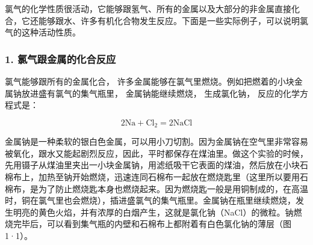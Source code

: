 氯气的化学性质很活动，它能够跟氢气、所有的金属以及大部分的非金属直接化合，它还能够跟水、许多有机化合物发生反应。下面是一些实际例子，可以说明氯气的这种活动性质。

\subsubsection{1. 氯气跟金属的化合反应}

氯气能够跟所有的金属化合，
许多金属能够在氯气里燃烧。例如把燃着的小块金属钠放进盛有氯气的集气瓶里，
金属钠能继续燃烧， 生成氯化钠， 反应的化学方程式是：

\[
2 \mathrm{Na} + \mathrm{Cl} _ {2} = 2 \mathrm{NaCl}
\]

金属钠是一种柔软的银白色金属，可以用小刀切割。因为金属钠在空气里非常容易被氧化，跟水又能起剧烈反应，因此，平时都保存在煤油里。做这个实验的时候，先用镊子从煤油里夹出一小块金属钠，用滤纸吸干它表面的煤油，然后放在小块石棉布上，加热至钠开始燃烧，迅速连同石棉布一起放在燃烧匙里（这里所以要用石棉布，是为了防止燃烧匙本身也燃烧起来。因为燃烧匙一般是用铜制成的，在高温时，铜在氯气里也会燃烧），插进盛氯气的集气瓶里。金属钠在瓶里继续燃烧，发生明亮的黄色火焰，并有浓厚的白烟产生，这就是氯化钠（NaCl）的微粒。钠燃烧完毕后，可以看到集气瓶的内壁和石棉布上都附着有白色氯化钠的薄层（图1·1）。

